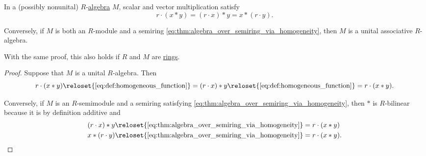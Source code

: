 \begin{proposition}\label{thm:algebra_over_semiring_via_homogeneity}
  In a (possibly nonunital) \( R \)-\hyperref[def:algebra_over_semiring]{algebra} \( M \), scalar and vector multiplication satisfy
  \begin{equation}\label{eq:thm:algebra_over_semiring_via_homogeneity}
    r \cdot (x \ast y) = (r \cdot x) \ast y = x \ast (r \cdot y).
  \end{equation}

  Conversely, if \( M \) is both an \( R \)-module and a semiring \eqref{eq:thm:algebra_over_semiring_via_homogeneity}, then \( M \) is a unital associative \( R \)-algebra.
\end{proposition}
\begin{comments}
  \item With the same proof, this also holds if \( R \) and \( M \) are \hyperref[def:ring]{rings}.
\end{comments}
\begin{proof}
  \SufficiencySubProof Suppose that \( M \) is a unital \( R \)-algebra. Then
  \begin{equation*}
    r \cdot (x \ast y)
    \reloset {\eqref{eq:def:homogeneous_function}} =
    (r \cdot x) \ast y
    \reloset {\eqref{eq:def:homogeneous_function}} =
    r \cdot (x \ast y).
  \end{equation*}

  \NecessitySubProof Conversely, if \( M \) is an \( R \)-semimodule and a semiring satisfying \eqref{eq:thm:algebra_over_semiring_via_homogeneity}, then \( {\ast} \) is \( R \)-bilinear because it is by definition additive and
  \begin{align*}
    (r \cdot x) \ast y
    &\reloset {\eqref{eq:thm:algebra_over_semiring_via_homogeneity}} =
    r \cdot (x \ast y)
    \\
    x \ast (r \cdot y)
    &\reloset {\eqref{eq:thm:algebra_over_semiring_via_homogeneity}} =
    r \cdot (x \ast y).
  \end{align*}
\end{proof}

